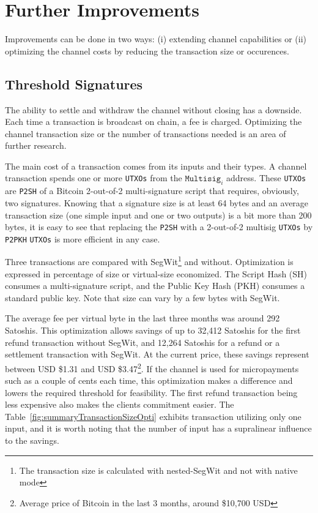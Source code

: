 \documentclass{llncs}
\begin{document}
\section{Further Improvements} Improvements can be done in two ways: (i)
extending channel capabilities or (ii) optimizing the channel costs by reducing
the transaction size or occurences.

\subsection{Threshold Signatures} The ability to settle and withdraw the channel
without closing has a downside. Each time a transaction is broadcast on chain, a
fee is charged. Optimizing the channel transaction size or the number of
transactions needed is an area of further research.

The main cost of a transaction comes from its inputs and their types. A channel
transaction spends one or more \texttt{UTXOs} from the $\texttt{Multisig}_{i}$
address. These \texttt{UTXOs} are \texttt{P2SH} of a Bitcoin 2-out-of-2
multi-signature script that requires, obviously, two signatures. Knowing that a
signature size is at least 64 bytes and an average transaction size (one simple
input and one or two outputs) is a bit more than 200 bytes, it is easy to see
that replacing the \texttt{P2SH} with a 2-out-of-2 multisig \texttt{UTXOs} by
\texttt{P2PKH} \texttt{UTXOs} is more efficient in any case.

Three transactions are compared with SegWit\footnote{ The transaction size
is calculated with nested-SegWit and not with native mode} and without.
Optimization is expressed in percentage of size or virtual-size economized. The
Script Hash (SH) consumes a multi-signature script, and the Public Key Hash
(PKH) consumes a standard public key. Note that size can vary by a few bytes
with SegWit.

The average fee per virtual byte in the last three months was around 292
Satoshis. This optimization allows savings of up to 32,412 Satoshis for the
first refund transaction without SegWit, and 12,264 Satoshis for a refund
or a settlement transaction with SegWit. At the current price, these
savings represent between USD \$1.31 and USD \$3.47\footnote{ Average price of
Bitcoin in the last 3 months, around \$10,700 USD}. If the channel is used for
micropayments such as a couple of cents each time, this optimization makes a
difference and lowers the required threshold for feasibility. The first refund
transaction being less expensive also makes the clients commitment easier. The
Table~\ref{fig:summaryTransactionSizeOpti} exhibits transaction utilizing only
one input, and it is worth noting that the number of input has a supralinear
influence to the savings.
\end{document}
